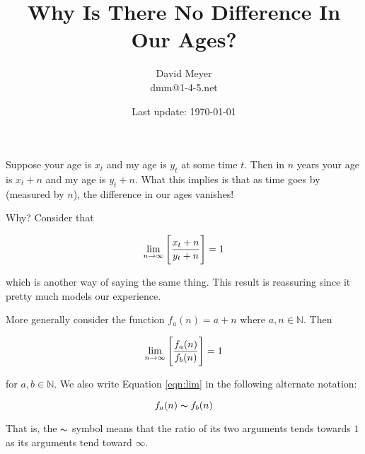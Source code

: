 \documentclass[11pt, oneside]{article}   	%
\title{Why Is There No Difference In Our Ages?}
\author{David Meyer \\ dmm@1-4-5.net}
\date{Last update: \today}							%
\theoremstyle{definition}
\begin{document}
\maketitle

\bigskip
\noindent
Suppose your age is $x_t$ and my age is $y_t$ at some time $t$. Then in $n$ years your age is $x_t + n$ and my age is $y_t + n$. What this implies
is that as time goes by (measured by $n$), the difference in our ages vanishes!

\bigskip
\noindent
Why? Consider that 

\begin{equation*}
\centering
\lim\limits_{n \to \infty} \Bigg [ \frac{x_t + n}{y_t + n} \Bigg ]  = 1
\end{equation*}

\bigskip
\noindent
which is another way of saying the same thing. This result is reassuring since it pretty much models our experience. 

\bigskip
\noindent
More generally consider the function $f_a(n) = a + n$ where $a,n \in \mathbb{N}$. Then

\bigskip
\begin{equation}
\centering
\lim\limits_{n \to \infty} \Bigg [ \frac{f_a(n)}{f_b(n)} \Bigg ]  = 1
\label{eqn:lim}
\end{equation}

\bigskip
\noindent
for $a,b \in \mathbb{N}$. We also write Equation \ref{eqn:lim} in the following alternate notation:

\bigskip
\begin{equation*}
f_a(n) \thicksim f_b(n)
 \end{equation*}

\bigskip
\noindent
That is, the $\thicksim$ symbol means that the ratio of its two arguments tends towards $1$ as its arguments tend toward $\infty$.
\end{document}
